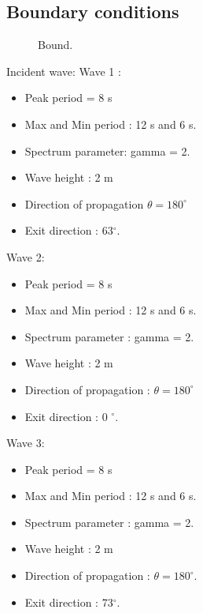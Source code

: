 \subsection{Boundary conditions}
\begin{figure}[h]
\begin{center}
\end{center}
\caption{Bound.}
\label{fig:creocean_bc}
\end{figure}
Incident wave:
Wave 1 :
\begin{itemize}
\item Peak period = 8 s
\item Max and Min period : 12 s and 6 s.
\item Spectrum parameter: gamma = 2.
\item Wave height : 2 m
\item Direction of propagation $\theta =180^\circ$
\item Exit direction : 63$^\circ$.
\end{itemize}
Wave 2:
\begin{itemize}
\item Peak period = 8 s
\item Max and Min period : 12 s and 6 s.
\item Spectrum parameter : gamma = 2.
\item Wave height : 2 m
\item Direction of propagation : $\theta =180^\circ$
\item Exit direction : 0 $^\circ$.
\end{itemize}
Wave 3:
\begin{itemize}
\item Peak period = 8 s
\item Max and Min period : 12 s and 6 s.
\item Spectrum parameter : gamma = 2.
\item Wave height : 2 m
\item Direction of propagation : $\theta =180^\circ$.
\item Exit direction : 73$^\circ$.
\end{itemize}

